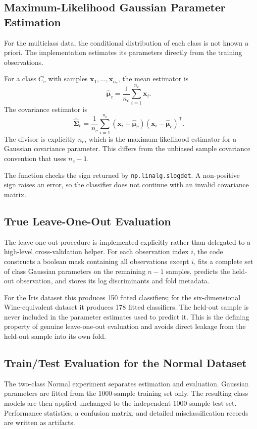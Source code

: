 \documentclass[11pt,a4paper]{article}
\newcommand{\code}[1]{\texttt{#1}}
\begin{document}
\subsection{Maximum-Likelihood Gaussian Parameter Estimation}
For the multiclass data, the conditional distribution of each class is not known a priori. The implementation estimates its parameters directly from the training observations.

For a class $C_c$ with samples $\mathbf{x}_1,\ldots,\mathbf{x}_{n_c}$, the mean estimator is
\begin{equation}
\widehat{\boldsymbol{\mu}}_c
=
\frac{1}{n_c}
\sum_{i=1}^{n_c}\mathbf{x}_i.
\end{equation}
The covariance estimator is
\begin{equation}
\widehat{\boldsymbol{\Sigma}}_c
=
\frac{1}{n_c}
\sum_{i=1}^{n_c}
(\mathbf{x}_i-\widehat{\boldsymbol{\mu}}_c)
(\mathbf{x}_i-\widehat{\boldsymbol{\mu}}_c)^{\mathsf T}.
\end{equation}
The divisor is explicitly $n_c$, which is the maximum-likelihood estimator for a Gaussian covariance parameter. This differs from the unbiased sample covariance convention that uses $n_c-1$.

The function checks the sign returned by \code{np.linalg.slogdet}. A non-positive sign raises an error, so the classifier does not continue with an invalid covariance matrix.

\subsection{True Leave-One-Out Evaluation}
The leave-one-out procedure is implemented explicitly rather than delegated to a high-level cross-validation helper. For each observation index $i$, the code constructs a boolean mask containing all observations except $i$, fits a complete set of class Gaussian parameters on the remaining $n-1$ samples, predicts the held-out observation, and stores its log discriminants and fold metadata.

For the Iris dataset this produces 150 fitted classifiers; for the six-dimensional Wine-equivalent dataset it produces 178 fitted classifiers. The held-out sample is never included in the parameter estimates used to predict it. This is the defining property of genuine leave-one-out evaluation and avoids direct leakage from the held-out sample into its own fold.

\subsection{Train/Test Evaluation for the Normal Dataset}
The two-class Normal experiment separates estimation and evaluation. Gaussian parameters are fitted from the 1000-sample training set only. The resulting class models are then applied unchanged to the independent 1000-sample test set. Performance statistics, a confusion matrix, and detailed misclassification records are written as artifacts.
\end{document}
